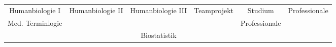 \begin{table}[htbp]
{\begin{tabular}{cc|c|ccc}
			\multicolumn{1}{|c|}{Humanbiologie I}                  & Humanbiologie II & Humanbiologie III & \multicolumn{1}{c|}{Teamprojekt}      & \multicolumn{1}{c|}{Studium}            & \multicolumn{1}{c|}{Professionale}  \\ \cline{1-1} \cline{6-6} 
			\multicolumn{1}{|c|}{Med. Terminlogie}                 &                  &                   & \multicolumn{1}{c|}{}                 & \multicolumn{1}{c|}{Professionale}      &                                     \\ \cline{1-5}
			                                                       &                  & Biostatistik      &                                       &                                         &                                     \\ \cline{3-3}
		\end{tabular}}
\end{table}